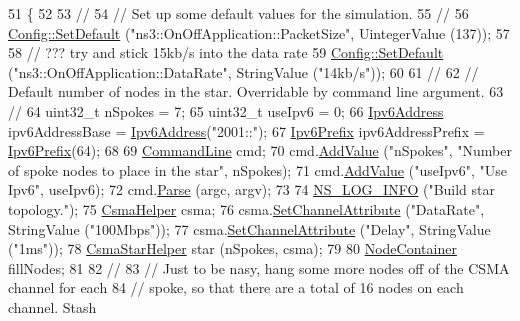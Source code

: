 \begin{DoxyCode}
51 \{
52 
53   \textcolor{comment}{//}
54   \textcolor{comment}{// Set up some default values for the simulation.}
55   \textcolor{comment}{//}
56   \hyperlink{group__config_ga2e7882df849d8ba4aaad31c934c40c06}{Config::SetDefault} (\textcolor{stringliteral}{"ns3::OnOffApplication::PacketSize"}, UintegerValue (137));
57 
58   \textcolor{comment}{// ??? try and stick 15kb/s into the data rate}
59   \hyperlink{group__config_ga2e7882df849d8ba4aaad31c934c40c06}{Config::SetDefault} (\textcolor{stringliteral}{"ns3::OnOffApplication::DataRate"}, StringValue (\textcolor{stringliteral}{"14kb/s"}));
60 
61   \textcolor{comment}{//}
62   \textcolor{comment}{// Default number of nodes in the star.  Overridable by command line argument.}
63   \textcolor{comment}{//}
64   uint32\_t nSpokes = 7;
65   uint32\_t useIpv6 = 0;
66   \hyperlink{classns3_1_1Ipv6Address}{Ipv6Address} ipv6AddressBase = \hyperlink{classns3_1_1Ipv6Address}{Ipv6Address}(\textcolor{stringliteral}{"2001::"});
67   \hyperlink{classns3_1_1Ipv6Prefix}{Ipv6Prefix} ipv6AddressPrefix = \hyperlink{classns3_1_1Ipv6Prefix}{Ipv6Prefix}(64);
68 
69   \hyperlink{classns3_1_1CommandLine}{CommandLine} cmd;
70   cmd.\hyperlink{classns3_1_1CommandLine_addcfb546c7ad4c8bd0965654d55beb8e}{AddValue} (\textcolor{stringliteral}{"nSpokes"}, \textcolor{stringliteral}{"Number of spoke nodes to place in the star"}, nSpokes);
71   cmd.\hyperlink{classns3_1_1CommandLine_addcfb546c7ad4c8bd0965654d55beb8e}{AddValue} (\textcolor{stringliteral}{"useIpv6"}, \textcolor{stringliteral}{"Use Ipv6"}, useIpv6);
72   cmd.\hyperlink{classns3_1_1CommandLine_a5c10b85b3207e5ecb48d907966923156}{Parse} (argc, argv);
73 
74   \hyperlink{group__logging_gafbd73ee2cf9f26b319f49086d8e860fb}{NS\_LOG\_INFO} (\textcolor{stringliteral}{"Build star topology."});
75   \hyperlink{classns3_1_1CsmaHelper}{CsmaHelper} csma;
76   csma.\hyperlink{classns3_1_1CsmaHelper_a886d900b2fe44433e0b81752dea7e7f1}{SetChannelAttribute} (\textcolor{stringliteral}{"DataRate"}, StringValue (\textcolor{stringliteral}{"100Mbps"}));
77   csma.\hyperlink{classns3_1_1CsmaHelper_a886d900b2fe44433e0b81752dea7e7f1}{SetChannelAttribute} (\textcolor{stringliteral}{"Delay"}, StringValue (\textcolor{stringliteral}{"1ms"}));
78   \hyperlink{classns3_1_1CsmaStarHelper}{CsmaStarHelper} star (nSpokes, csma);
79 
80   \hyperlink{classns3_1_1NodeContainer}{NodeContainer} fillNodes;
81 
82   \textcolor{comment}{//}
83   \textcolor{comment}{// Just to be nasy, hang some more nodes off of the CSMA channel for each}
84   \textcolor{comment}{// spoke, so that there are a total of 16 nodes on each channel.  Stash}

\end{DoxyCode}
